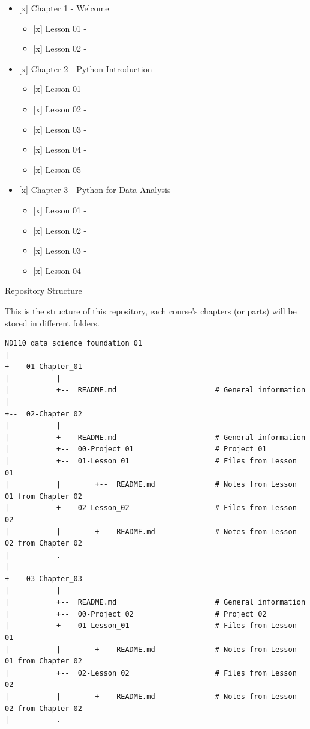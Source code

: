 \documentclass[]{book}
\providecommand{\tightlist}{%
  \setlength{\itemsep}{0pt}\setlength{\parskip}{0pt}}
\begin{document}
\begin{itemize}
\tightlist
\item
  {[}x{]} Chapter 1 - Welcome

  \begin{itemize}
  \tightlist
  \item
    {[}x{]} Lesson 01 -
  \item
    {[}x{]} Lesson 02 -
  \end{itemize}
\item
  {[}x{]} Chapter 2 - Python Introduction

  \begin{itemize}
  \tightlist
  \item
    {[}x{]} Lesson 01 -
  \item
    {[}x{]} Lesson 02 -
  \item
    {[}x{]} Lesson 03 -
  \item
    {[}x{]} Lesson 04 -
  \item
    {[}x{]} Lesson 05 -
  \end{itemize}
\item
  {[}x{]} Chapter 3 - Python for Data Analysis

  \begin{itemize}
  \tightlist
  \item
    {[}x{]} Lesson 01 -
  \item
    {[}x{]} Lesson 02 -
  \item
    {[}x{]} Lesson 03 -
  \item
    {[}x{]} Lesson 04 -
  \end{itemize}
\end{itemize}

Repository Structure

This is the structure of this repository, each course's chapters (or
parts) will be stored in different folders.

\begin{verbatim}
ND110_data_science_foundation_01
|
+--  01-Chapter_01
|           |
|           +--  README.md                       # General information
|
+--  02-Chapter_02
|           |
|           +--  README.md                       # General information
|           +--  00-Project_01                   # Project 01
|           +--  01-Lesson_01                    # Files from Lesson 01
|           |        +--  README.md              # Notes from Lesson 01 from Chapter 02
|           +--  02-Lesson_02                    # Files from Lesson 02
|           |        +--  README.md              # Notes from Lesson 02 from Chapter 02
|           .
|
+--  03-Chapter_03
|           |
|           +--  README.md                       # General information
|           +--  00-Project_02                   # Project 02
|           +--  01-Lesson_01                    # Files from Lesson 01
|           |        +--  README.md              # Notes from Lesson 01 from Chapter 02
|           +--  02-Lesson_02                    # Files from Lesson 02
|           |        +--  README.md              # Notes from Lesson 02 from Chapter 02
|           .
\end{verbatim}
\end{document}
